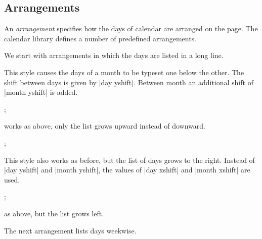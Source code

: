 \subsection{Arrangements}

An \emph{arrangement} specifies how the days of calendar are arranged
on the page. The calendar library defines a number of predefined
arrangements.

We start with arrangements in which the days are listed in a long
line. 

\begin{itemize}
  This style causes the days of a month to be typeset one below the
  other. The shift between days is given by |day yshift|. Between
  month an additional shift of |month yshift| is added.
\begin{codeexample}[]
\tikz
  \calendar [dates=2000-01-28 to 2000-02-03,
             day list downward,month yshift=1em];
\end{codeexample}
  works as above, only the list grows upward instead of downward.
\begin{codeexample}[]
\tikz
  \calendar [dates=2000-01-28 to 2000-02-03,
             day list upward,month yshift=1em];
\end{codeexample}
  This style also works as before, but the list of days grows to the
  right. Instead of |day yshift| and |month yshift|, the values of
  |day xshift| and |month xshift| are used.
\begin{codeexample}[]
\tikz
  \calendar [dates=2000-01-28 to 2000-02-03,
             day list right,month xshift=1em];
\end{codeexample}
  as above, but the list grows left.
\end{itemize}

The next arrangement lists days weekwise.

